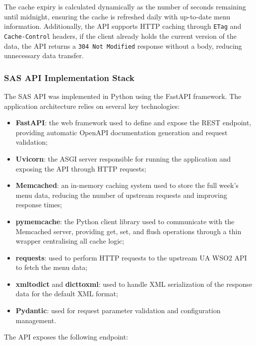 \documentclass[12pt, a4paper]{report}
\begin{document}
The cache expiry is calculated dynamically as the number of seconds remaining until midnight,
ensuring the cache is refreshed daily with up-to-date menu information. Additionally, the API
supports HTTP caching through \texttt{ETag} and \texttt{Cache-Control} headers, if the
client already holds the current version of the data, the API returns a \texttt{304 Not Modified}
response without a body, reducing unnecessary data transfer.

\subsubsection{SAS API Implementation Stack}
The SAS API was implemented in Python using the FastAPI framework. The application
architecture relies on several key technologies:

\begin{itemize}
    \item \textbf{FastAPI}: the web framework used to define and expose the REST endpoint,
          providing automatic OpenAPI documentation generation and request validation;
    \item \textbf{Uvicorn}: the ASGI server responsible for running the application and
          exposing the API through HTTP requests;
    \item \textbf{Memcached}: an in-memory caching system used to store the full week's
          menu data, reducing the number of upstream requests and improving response times;
    \item \textbf{pymemcache}: the Python client library used to communicate with the
          Memcached server, providing get, set, and flush operations through a thin wrapper
          centralising all cache logic;
    \item \textbf{requests}: used to perform HTTP requests to the upstream UA WSO2 API
          to fetch the menu data;
    \item \textbf{xmltodict} and \textbf{dicttoxml}: used to handle XML serialization
          of the response data for the default XML format;
    \item \textbf{Pydantic}: used for request parameter validation and configuration
          management.
\end{itemize}

The API exposes the following endpoint:
\end{document}
